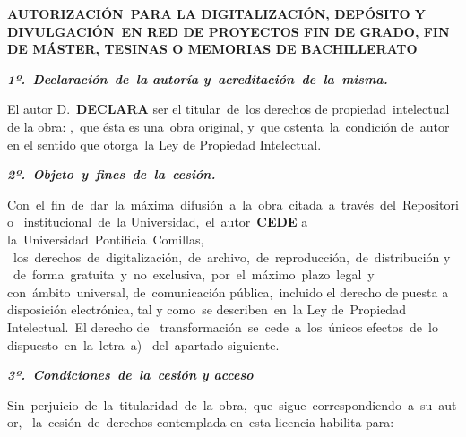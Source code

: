 \textbf{AUTORIZACIÓN PARA LA DIGITALIZACIÓN, DEPÓSITO Y DIVULGACIÓN EN RED DE PROYECTOS FIN DE GRADO, FIN DE MÁSTER, TESINAS O MEMORIAS DE BACHILLERATO}
\vspace*{1em}

\textbf{\textit{1º. Declaración de la autoría y acreditación de la misma.}}
\vspace*{1em}
 
El autor D.\underline{\hspace{6cm}} \textbf{DECLARA} ser el titular de los derechos de 
propiedad intelectual de la obra: \underline{\hspace{6cm}}, que ésta es una obra original, 
y que ostenta la condición de autor en el sentido que otorga la Ley de Propiedad Intelectual.
 
\vspace*{1em}
\textbf{\textit{2º. Objeto y fines de la cesión.}}
\vspace*{1em}

Con el fin de dar la máxima difusión a la obra citada a través del Repositorio 
institucional de la Universidad, el autor \textbf{CEDE} a la Universidad Pontificia Comillas,
 los derechos de digitalización, de archivo, de reproducción, de distribución y 
 de forma gratuita y no exclusiva, por el máximo plazo legal y con ámbito universal,
de comunicación pública, incluido el derecho de puesta a disposición electrónica, 
tal y como se describen en la Ley de Propiedad Intelectual. El derecho de 
transformación se cede a los únicos efectos de lo dispuesto en la letra a) 
del apartado siguiente.

\vspace*{1em}
\textbf{\textit{3º. Condiciones de la cesión y acceso}} 
\vspace*{1em}

Sin perjuicio de la titularidad de la obra, que sigue correspondiendo a su autor, 
la cesión de derechos contemplada en esta licencia habilita para:
 
